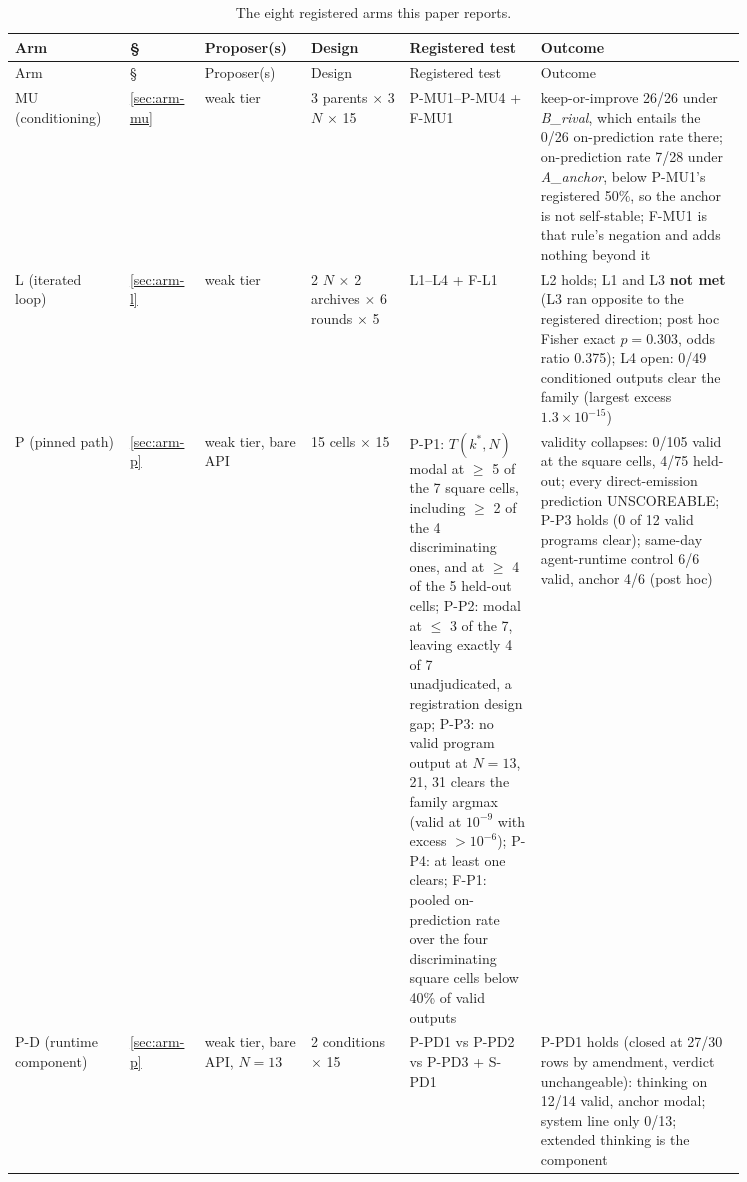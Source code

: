 \begin{small}
\setlength{\tabcolsep}{3.5pt}
\begin{longtable}{@{}p{0.14\linewidth}p{0.07\linewidth}p{0.11\linewidth}p{0.12\linewidth}p{0.16\linewidth}p{0.25\linewidth}@{}}
\caption{The eight registered arms this paper reports.}
\label{tab:arms} \\
\toprule
Arm & \S & Proposer(s) & Design & Registered test & Outcome \\
\midrule
\endfirsthead
\toprule
Arm & \S & Proposer(s) & Design & Registered test & Outcome \\
\midrule
\endhead
MU (conditioning) & \ref{sec:arm-mu} & weak tier & 3 parents $\times$ 3 $N$ $\times$ 15 & P-MU1--P-MU4 + F-MU1 & keep-or-improve 26/26 under \emph{B\_rival}, which entails the 0/26 on-prediction rate there; on-prediction rate 7/28 under \emph{A\_anchor}, below P-MU1's registered 50\%, so the anchor is not self-stable; F-MU1 is that rule's negation and adds nothing beyond it \\
L (iterated loop) & \ref{sec:arm-l} & weak tier & 2 $N$ $\times$ 2 archives $\times$ 6 rounds $\times$ 5 & L1--L4 + F-L1 & L2 holds; L1 and L3 \textbf{not met} (L3 ran opposite to the registered direction; post hoc Fisher exact $p = 0.303$, odds ratio 0.375); L4 open: 0/49 conditioned outputs clear the family (largest excess $1.3\times10^{-15}$) \\
P (pinned path) & \ref{sec:arm-p} & weak tier, bare API & 15 cells $\times$ 15 & P-P1: $T(k^*, N)$ modal at $\ge$ 5 of the 7 square cells, including $\ge$ 2 of the 4 discriminating ones, and at $\ge$ 4 of the 5 held-out cells; P-P2: modal at $\le$ 3 of the 7, leaving exactly 4 of 7 unadjudicated, a registration design gap; P-P3: no valid program output at $N = 13$, 21, 31 clears the family argmax (valid at $10^{-9}$ with excess $>10^{-6}$); P-P4: at least one clears; F-P1: pooled on-prediction rate over the four discriminating square cells below 40\% of valid outputs & validity collapses: 0/105 valid at the square cells, 4/75 held-out; every direct-emission prediction UNSCOREABLE; P-P3 holds (0 of 12 valid programs clear); same-day agent-runtime control 6/6 valid, anchor 4/6 (post hoc) \\
P-D (runtime component) & \ref{sec:arm-p} & weak tier, bare API, $N = 13$ & 2 conditions $\times$ 15 & P-PD1 vs P-PD2 vs P-PD3 + S-PD1 & P-PD1 holds (closed at 27/30 rows by amendment, verdict unchangeable): thinking on 12/14 valid, anchor modal; system line only 0/13; extended thinking is the component \\

\end{longtable}
\end{small}
